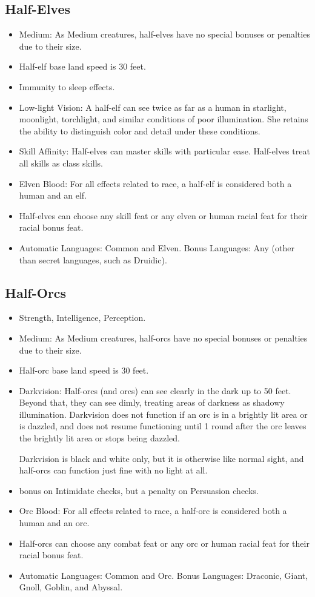 \subsection{Half-Elves}
\begin{itemize}
\item Medium: As Medium creatures, half-elves have no special bonuses or penalties due to their size.
\item Half-elf base land speed is 30 feet.
\item Immunity to sleep effects.
\item Low-light Vision: A half-elf can see twice as far as a human in starlight, moonlight, torchlight, and similar conditions of poor illumination. She retains the ability to distinguish color and detail under these conditions.
 \item Skill Affinity: Half-elves can master skills with particular ease. Half-elves treat all skills as class skills.
\item Elven Blood: For all effects related to race, a half-elf is considered both a human and an elf.
\item Half-elves can choose any skill feat or any elven or human racial feat for their racial bonus feat.
\item Automatic Languages: Common and Elven. Bonus Languages: Any (other than secret languages, such as Druidic).
\end{itemize}

\subsection{Half-Orcs}
\begin{itemize}
\item {} Strength,  Intelligence,  Perception.
\item Medium: As Medium creatures, half-orcs have no special bonuses or penalties due to their size.
\item Half-orc base land speed is 30 feet.
\item Darkvision: Half-orcs (and orcs) can see clearly in the dark up to 50 feet.  Beyond that, they can see dimly, treating areas of darkness as shadowy illumination. Darkvision does not function if an orc is in a brightly lit area or is dazzled, and does not resume functioning until 1 round after the orc leaves the brightly lit area or stops being dazzled.
\par Darkvision is black and white only, but it is otherwise like normal sight, and half-orcs can function just fine with no light at all.
\item {} bonus on Intimidate checks, but a  penalty on Persuasion checks.
\item Orc Blood: For all effects related to race, a half-orc is considered both a human and an orc.
\item Half-orcs can choose any combat feat or any orc or human racial feat for their racial bonus feat.
\item Automatic Languages: Common and Orc. Bonus Languages: Draconic, Giant, Gnoll, Goblin, and Abyssal.
\end{itemize}

